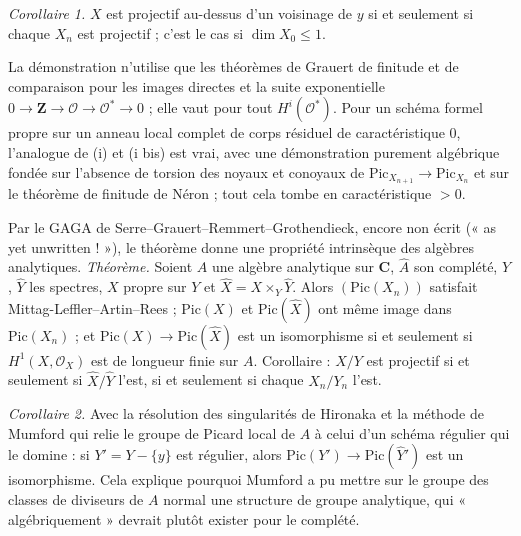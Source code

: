 \documentclass[11pt,a4paper]{article}
\begin{document}
\emph{Corollaire 1.} $X$ est projectif au-dessus d'un voisinage de $y$ si et
seulement si chaque $X_n$ est projectif ; c'est le cas si $\dim X_0 \leq 1$.

La démonstration n'utilise que les théorèmes de Grauert de finitude et de
comparaison pour les images directes et la suite exponentielle
$0 \to \mathbf{Z} \to \mathcal{O} \to \mathcal{O}^* \to 0$ ; elle vaut pour tout
$H^i(\mathcal{O}^*)$. Pour un schéma formel propre sur un anneau local complet
de corps résiduel de caractéristique $0$, l'analogue de (i) et (i bis) est
vrai, avec une démonstration purement algébrique fondée sur l'absence de torsion
des noyaux et conoyaux de $\mathrm{Pic}_{X_{n+1}} \to \mathrm{Pic}_{X_n}$ et sur
le théorème de finitude de Néron ; tout cela tombe en caractéristique $> 0$.

Par le GAGA de Serre--Grauert--Remmert--Grothendieck, encore non écrit (« as yet
unwritten ! »), le théorème donne une propriété intrinsèque des algèbres
analytiques. \emph{Théorème.} Soient $A$ une algèbre analytique sur $\mathbf{C}$,
$\hat{A}$ son complété, $Y$, $\hat{Y}$ les spectres, $X$ propre sur $Y$ et
$\hat{X} = X \times_Y \hat{Y}$. Alors $(\mathrm{Pic}(X_n))$ satisfait
Mittag-Leffler--Artin--Rees ; $\mathrm{Pic}(X)$ et $\mathrm{Pic}(\hat{X})$ ont
même image dans $\mathrm{Pic}(X_n)$ ; et
$\mathrm{Pic}(X) \to \mathrm{Pic}(\hat{X})$ est un isomorphisme si et seulement
si $H^1(X, \mathcal{O}_X)$ est de longueur finie sur $A$. Corollaire : $X/Y$
est projectif si et seulement si $\hat{X}/\hat{Y}$ l'est, si et seulement si
chaque $X_n/Y_n$ l'est.

\emph{Corollaire 2.} Avec la résolution des singularités de Hironaka et la
méthode de Mumford qui relie le groupe de Picard local de $A$ à celui d'un
schéma régulier qui le domine : si $Y' = Y - \{y\}$ est régulier, alors
$\mathrm{Pic}(Y') \to \mathrm{Pic}(\hat{Y}')$ est un isomorphisme. Cela
explique pourquoi Mumford a pu mettre sur le groupe des classes de diviseurs
de $A$ normal une structure de groupe analytique, qui « algébriquement »
devrait plutôt exister pour le complété.
\end{document}
